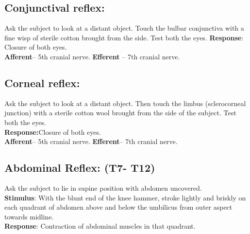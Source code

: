 \documentclass[a4paper,12pt]{book}
\begin{document}
\subsection*{Conjunctival reflex:}
	Ask the subject to look at a distant object. Touch the bulbar conjunctiva with a fine wisp of sterile cotton brought from the side. Test both the eyes.\newline
\textbf{Response}: Closure of both eyes.\\  
\textbf{Afferent}– 5th cranial nerve. \textbf{Efferent} – 7th cranial nerve.
\subsection*{Corneal reflex:}
Ask the subject to look at a distant object. Then touch the limbus (sclerocorneal junction) with a sterile cotton wool brought from the side of the subject. Test both the eyes.\\
\textbf{Response:}Closure of both eyes.\\
\textbf{Afferent}– 5th cranial nerve. \textbf{Efferent}– 7th cranial nerve.
\subsection*{Abdominal Reflex: (T7- T12)}
Ask the subject to lie in supine position with abdomen uncovered.\\
\textbf{Stimulus}: With the blunt end of the knee hammer, stroke lightly and briskly on each quadrant of abdomen above and below the umbilicus from outer aspect towards midline.\\
\textbf{Response}: Contraction of abdominal muscles in that quadrant.
\end{document}
